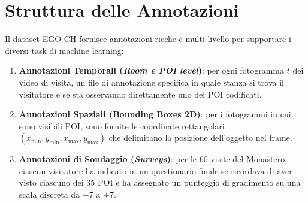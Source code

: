 \documentclass[a4paper,12pt]{report}
\begin{document}
\begin{table}[htbp]
\centering
\caption{Statistiche riassuntive del dataset EGO-CH per i due siti culturali.}
\label{tab:egoch_summary}
\end{table}

\section{Struttura delle Annotazioni}

Il dataset EGO-CH fornisce annotazioni ricche e multi-livello per supportare i diversi task di machine learning:

\begin{enumerate}
    \item \textbf{Annotazioni Temporali (\emph{Room e POI level})}: per ogni fotogramma $t$ dei video di visita, un file di annotazione specifica in quale stanza si trova il visitatore e se sta osservando direttamente uno dei POI codificati.
    \item \textbf{Annotazioni Spaziali (Bounding Boxes 2D)}: per i fotogrammi in cui sono visibili POI, sono fornite le coordinate rettangolari $(x_{\min}, y_{\min}, x_{\max}, y_{\max})$ che delimitano la posizione dell'oggetto nel frame.
    \item \textbf{Annotazioni di Sondaggio (\emph{Surveys})}: per le 60 visite del Monastero, ciascun visitatore ha indicato in un questionario finale se ricordava di aver visto ciascuno dei 35 POI e ha assegnato un punteggio di gradimento su una scala discreta da $-7$ a $+7$.
\end{enumerate}
\end{document}
